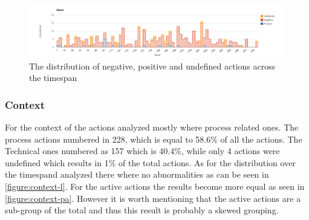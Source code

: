 \begin{figure}
	\centering
	\includegraphics[width=\textwidth, keepaspectratio]{figures/nature-l.png}
	\caption{The distribution of negative, positive and undefined actions across the timespan}
	\label{figure:nature-l}
\end{figure}

\clearpage

\subsubsection{Context}
For the context of the actions analyzed mostly where process related ones. The process actions numbered in 228, which is equal to 58.6\% of all the actions. The Technical ones numbered as 157 which is 40.4\%, while only 4 actions were undefined which results in 1\% of the total actions. As for the distribution over the timespand analyzed there where no abnormalities as can be seen in \autoref{figure:context-l}. For the active actions the results become more equal as seen in \autoref{figure:context-pa}. However it is worth mentioning that the active actions are a sub-group of the total and thus this result is probably a skewed grouping. 

\begin{table}[!h]
	\begin{center}
	\caption{Analysis results from the content analysis for the context of the action.}
	\label{table:context-results}
	\end{center}
\end{table}


